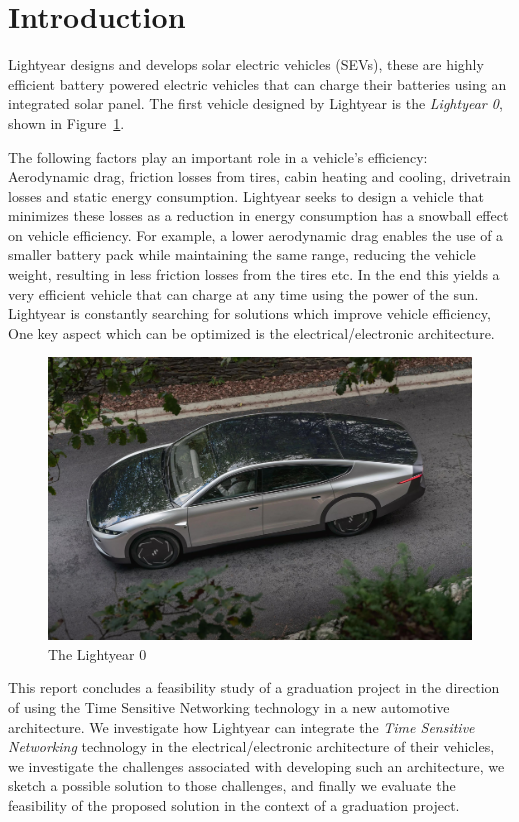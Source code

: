 \section{Introduction}
\label{sec:introduction}
Lightyear designs and develops solar electric vehicles (SEVs), these are highly efficient battery powered electric vehicles that can charge their batteries using an integrated solar panel. The first vehicle designed by Lightyear is the \textit{Lightyear 0}, shown in Figure~\ref{fig:zero}. 

The following factors play an important role in a vehicle's efficiency: Aerodynamic drag, friction losses from tires, cabin heating and cooling, drivetrain losses and static energy consumption. Lightyear seeks to design a vehicle that minimizes these losses as a reduction in energy consumption has a snowball effect on vehicle efficiency. For example, a lower aerodynamic drag enables the use of a smaller battery pack while maintaining the same range, reducing the vehicle weight, resulting in less friction losses from the tires etc. In the end this yields a very efficient vehicle that can charge at any time using the power of the sun. Lightyear is constantly searching for solutions which improve vehicle efficiency, One key aspect which can be optimized is the electrical/electronic architecture.

\begin{figure}[htb]
    \centering
    \includegraphics[width=\textwidth]{images/Lightyear_zero.jpg}
    \caption{The Lightyear 0}
    \label{fig:zero}
\end{figure}

This report concludes a feasibility study of a graduation project in the direction of using the Time Sensitive Networking technology in a new automotive architecture. We investigate how Lightyear can integrate the \textit{Time Sensitive Networking} technology in the electrical/electronic architecture of their vehicles, we investigate the challenges associated with developing such an architecture, we sketch a possible solution to those challenges, and finally we evaluate the feasibility of the proposed solution in the context of a graduation project. 

